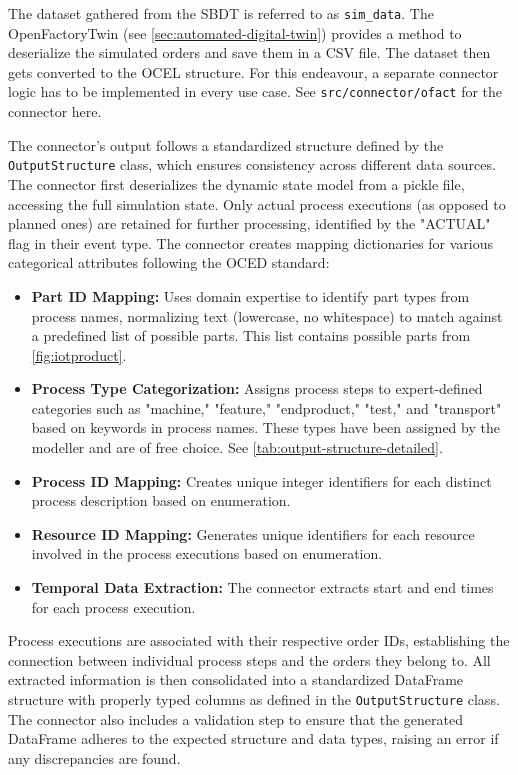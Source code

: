 The dataset gathered from the SBDT is referred to as \texttt{sim\_data}. The OpenFactoryTwin (see \autoref{sec:automated-digital-twin}) provides a method to deserialize the simulated orders and save them in a CSV file. The dataset then gets converted to the OCEL structure. For this endeavour, a separate connector logic has to be implemented in every use case. See \texttt{src/connector/ofact} for the connector here.

The connector's output follows a standardized structure defined by the \texttt{OutputStructure} class, which ensures consistency across different data sources. The connector first deserializes the dynamic state model from a pickle file, accessing the full simulation state. Only actual process executions (as opposed to planned ones) are retained for further processing, identified by the "ACTUAL" flag in their event type. The connector creates mapping dictionaries for various categorical attributes following the OCED standard:

\begin{itemize}
  \item \textbf{Part ID Mapping:} Uses domain expertise to identify part types from process names, normalizing text (lowercase, no whitespace) to match against a predefined list of possible parts. This list contains possible parts from \autoref{fig:iotproduct}.
  \item \textbf{Process Type Categorization:} Assigns process steps to expert-defined categories such as "machine," "feature," "endproduct," "test," and "transport" based on keywords in process names. These types have been assigned by the modeller and are of free choice. See \autoref{tab:output-structure-detailed}.
  \item \textbf{Process ID Mapping:} Creates unique integer identifiers for each distinct process description based on enumeration.
  \item \textbf{Resource ID Mapping:} Generates unique identifiers for each resource involved in the process executions based on enumeration.
  \item \textbf{Temporal Data Extraction:} The connector extracts start and end times for each process execution.
\end{itemize}

Process executions are associated with their respective order IDs, establishing the connection between individual process steps and the orders they belong to. All extracted information is then consolidated into a standardized DataFrame structure with properly typed columns as defined in the \texttt{OutputStructure} class. The connector also includes a validation step to ensure that the generated DataFrame adheres to the expected structure and data types, raising an error if any discrepancies are found.

